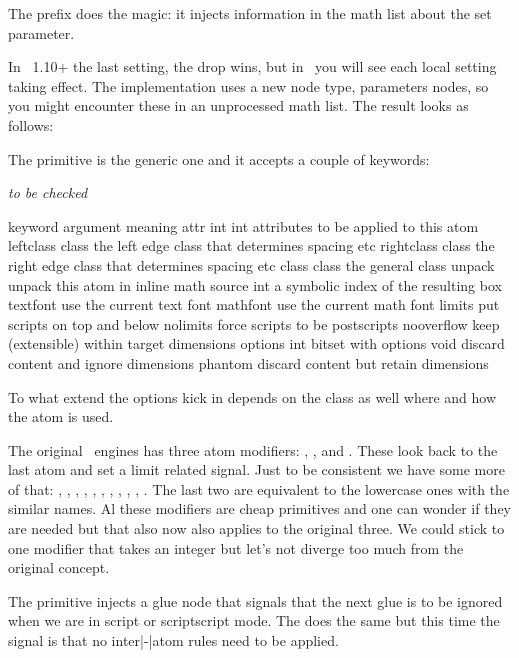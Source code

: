 \typebuffer

The \type {\frozen} prefix does the magic: it injects information in the
math list about the set parameter.

In \LUATEX\ 1.10+ the last setting, the \type {10pt} drop wins, but in
\LUAMETATEX\ you will see each local setting taking effect. The implementation
uses a new node type, parameters nodes, so you might encounter these in an
unprocessed math list. The result looks as follows:

\blank \getbuffer \blank

The \type {\mathatom} primitive is the generic one and it accepts a couple of
keywords:

{\em to be checked}

\starttabulate[|lT|l|l|]
\FL
\BC keyword    \BC argument \NC meaning \NC \NR
\TL
\NC attr       \NC int int \NC attributes to be applied to this atom \NC \NR
\NC leftclass  \NC class   \NC the left edge class that determines spacing etc \NC \NR
\NC rightclass \NC class   \NC the right edge class that determines spacing etc \NC \NR
\NC class      \NC class   \NC the general class \NC \NR
\NC unpack     \NC         \NC unpack this atom in inline math \NC \NR
\NC source     \NC int     \NC a symbolic index of the resulting box \NC \NR
\NC textfont   \NC         \NC use the current text font \NC \NR
\NC mathfont   \NC         \NC use the current math font \NC \NR
\NC limits     \NC         \NC put scripts on top and below \NC \NR
\NC nolimits   \NC         \NC force scripts to be postscripts \NC \NR
\NC nooverflow \NC         \NC keep (extensible) within target dimensions \NC \NR
\NC options    \NC int     \NC bitset with options \NC \NR
\NC void       \NC         \NC discard content and ignore dimensions \NC \NR
\NC phantom    \NC         \NC discard content but retain dimensions \NC \NR
\LL
\stoptabulate

To what extend the options kick in depends on the class as well where and how the
atom is used.

The original \TEX\ engines has three atom modifiers: \type {\displaylimits}, \type
{\limits}, and \type {\nolimits}. These look back to the last atom and set a limit
related signal. Just to be consistent we have some more of that: \typ
{\Umathadapttoleft}, \typ {\Umathadapttoright}, \typ {\Umathuseaxis}, \typ
{\Umathnoaxis}, \typ {\Umathphantom}, \typ {\Umathvoid}, \typ {\Umathsource}, \typ
{\Umathopenupheight}, \typ {\Umathopenupdepth}, \typ {\Umathlimits}, \typ
{\Umathnolimits}. The last two are equivalent to the lowercase ones with the
similar names. Al these modifiers are cheap primitives and one can wonder if they
are needed but that also now also applies to the original three. We could stick
to one modifier that takes an integer but let's not diverge too much from the
original concept.

The \type {\nonscript} primitive injects a glue node that signals that the next
glue is to be ignored when we are in script or scriptscript mode. The \typ
{\noatomruling} does the same but this time the signal is that no inter|-|atom
rules need to be applied.

\stopsection

\stopdocument
